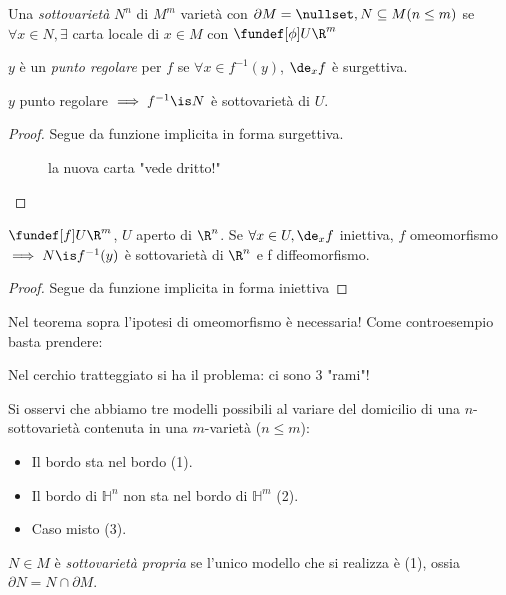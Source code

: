 
\begin{defn}[Sottovarietà]
 Una \emph{sottovarietà} $N^n$ di $M^m$ varietà con $\partial M = \nullset, N\subseteq M (n\le m)$ se $\forall x\in N, \exists$ carta locale di $x \in M$ con $\fundef[\phi] U\R^m $
\end{defn}
\begin{defn}
 $y$ è un \emph{punto regolare} per $f$ se $\forall x\in f^{-1}(y)$, $\de_xf$ è surgettiva.
\end{defn}
\begin{prop}
 $y$ punto regolare $\implies f^{-1}\is N$ è sottovarietà di $U$.
\end{prop}
\begin{proof}
 Segue da funzione implicita in forma surgettiva.
 \begin{figure}
  \centering
  
  \caption{la nuova carta "vede dritto!"}
 \end{figure}

\end{proof}
\begin{prop}
 $\fundef[f] U\R^m$, $U$ aperto di $\R^n$. Se $\forall x \in U, \de_xf$ iniettiva, $f$ omeomorfismo$\implies N\is f^{-1}(y)$ è sottovarietà di $\R^n$ e f diffeomorfismo.
\end{prop}
\begin{proof}
 Segue da funzione implicita in forma iniettiva
\end{proof}
\begin{oss}
 Nel teorema sopra l'ipotesi di omeomorfismo è necessaria!
 Come controesempio basta prendere:
 \begin{center}
  \centering
  
 \end{center}
 Nel cerchio tratteggiato si ha il problema: ci sono 3 "rami"!
\end{oss}
Si osservi che abbiamo tre modelli possibili al variare del domicilio di una  $n$-sottovarietà contenuta in una $m$-varietà ($n\le m$):
\begin{itemize}
 \item Il bordo sta nel bordo (1).
 \item Il bordo di $\mathbb H^n$ non sta nel bordo di $\mathbb H^m$ (2).
 \item Caso misto (3).
\end{itemize}
\begin{center}
 
\end{center}

\begin{defn}
 $N\in M$ è \emph{sottovarietà propria} se l'unico modello che si realizza è (1), ossia $\partial N = N\cap \partial M$.

\end{defn}
